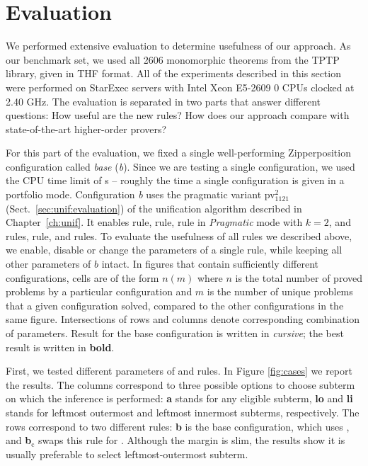 \section{Evaluation} 
\label{sect:bool:eval}

We performed extensive evaluation to determine usefulness of our approach. As
our benchmark set, we used all 2606 monomorphic theorems from the TPTP library,
given in THF format. All of the experiments described in this section were
performed on StarExec \cite{sst-14-starexec} servers with Intel Xeon E5-2609 0 CPUs clocked at 2.40 GHz. The evaluation is separated in two parts that
answer different questions: How useful are the new rules? How 
does our approach compare with state-of-the-art higher-order provers?

For this part of the evaluation, we fixed a single well-performing Zipperposition configuration
called \emph{base} (\emph{b}). Since we are testing a single configuration, we
used the CPU time limit of  s -- roughly the time a single configuration is
given in a portfolio mode. Configuration \emph{b} uses the pragmatic variant
pv$_{1121}^{2}$ (Sect.~\ref{sec:unif:evaluation}) of the unification algorithm described in Chapter~\ref{ch:unif}. 
It enables  rule,
 rule,  rule in \emph{Pragmatic} mode with $k=2$,
 and  rules,  rule, and  rules. 
To evaluate the usefulness of
all rules we described above, we enable, disable or change the
parameters of a single rule, while keeping all other parameters of $b$ intact. 
In figures that contain sufficiently different configurations, cells are of the form $n (m)$ where $n$ is the total
number of proved problems by a particular configuration and $m$ is the number of
unique problems that a given configuration solved, compared to the other
configurations in the same figure. Intersections of rows and columns
denote corresponding combination of parameters.
Result for the base configuration is written in \emph{cursive}; the best result
is written in \textbf{bold}.

First, we tested different parameters of  and 
rules. In Figure \ref{fig:cases} we report the results. The columns correspond to
three possible options to choose subterm on which the inference is performed:
\textbf{a} stands for any eligible subterm, \textbf{lo} and \textbf{li} stands
for leftmost outermost and leftmost innermost subterms, respectively. The rows
correspond to two different rules: 
\textbf{b} is the base configuration, which uses , and \textbf{b$_\text{c}$}
swaps this rule for . Although the margin is slim, the results show it is usually preferable to select leftmost-outermost
subterm.

